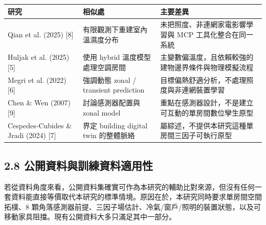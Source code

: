 \documentclass[12pt,a4paper]{article}
\begin{document}
\begin{table}[htbp]
\centering
\footnotesize
\renewcommand{\arraystretch}{1.25}
\begin{tabular}{|>{\raggedright\arraybackslash}p{}|>{\raggedright\arraybackslash}p{}|>{\raggedright\arraybackslash}p{}|}
\hline
\textbf{研究} & \textbf{相似處} & \textbf{主要差異} \\
\hline
Qian et al. (2025) [8] & 有限觀測下重建室內溫濕度分布 & 未把照度、非連網家電影響學習與 MCP 工具化整合在同一系統 \\
\hline
Huljak et al. (2025) [5] & 使用 hybrid 溫度模型處理空調房間 & 主變數偏溫度，且依賴較強的建物邊界條件與物理模擬流程 \\
\hline
Megri et al. (2022) [6] & 強調動態 zonal / transient prediction & 目標偏熱舒適分析，不處理照度與非連網裝置學習 \\
\hline
Chen \& Wen (2007) [9] & 討論感測器配置與 zonal model & 重點在感測器設計，不是建立可互動的單房間數位孿生原型 \\
\hline
Cespedes-Cubides \& Jradi (2024) [7] & 界定 building digital twin 的整體脈絡 & 屬綜述，不提供本研究這種單房間三因子可執行原型 \\
\hline
\end{tabular}
\end{table}

\subsection*{2.8 公開資料與訓練資料適用性}

若從資料角度來看，公開資料集確實可作為本研究的輔助比對來源，但沒有任何一套資料能直接等價取代本研究的標準情境。原因在於，本研究同時要求單房間空間拓樸、8 顆角落感測器前提、三因子場估計、冷氣/窗戶/照明的裝置狀態，以及可移動家具阻擋。現有公開資料大多只滿足其中一部分。
\end{document}

